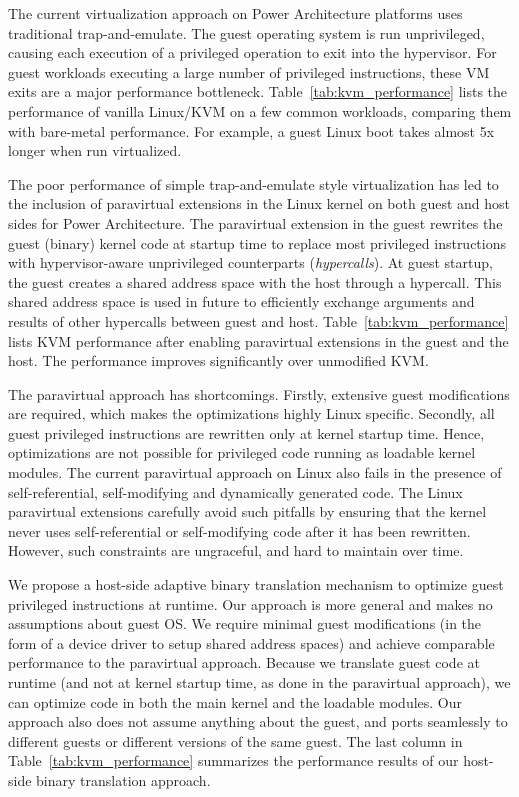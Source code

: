 \documentclass[10pt,twocolumn]{article}
\begin{document}
The current virtualization approach on Power Architecture platforms uses traditional
trap-and-emulate. The guest operating system is run unprivileged, causing each
execution of a privileged
operation to exit into the hypervisor. For guest workloads executing a large number
of privileged instructions, these VM exits are a major performance
bottleneck. Table~\ref{tab:kvm_performance} lists the performance of vanilla Linux/KVM
on a few common workloads, comparing them with bare-metal performance.
For example, a guest Linux boot takes almost 5x longer when run virtualized.

The poor performance of simple trap-and-emulate style virtualization has led to
the inclusion of paravirtual extensions in the Linux kernel on both
guest and host sides for Power Architecture\cite{pvpower}. The paravirtual extension in the guest
rewrites the guest (binary) kernel
code at startup time to replace most privileged instructions with
hypervisor-aware unprivileged counterparts ({\em hypercalls}).
At guest startup, the guest creates a shared address space with
the host through a hypercall. This shared address space
is used in future to efficiently exchange arguments and results of other hypercalls between guest and host.
Table~\ref{tab:kvm_performance} lists KVM performance after enabling paravirtual
extensions in the guest and the host. The performance improves significantly over
unmodified KVM.

The paravirtual approach has shortcomings. Firstly, extensive guest
modifications are required, which makes the optimizations highly Linux specific.
Secondly, all guest
privileged instructions are rewritten only at kernel startup time. Hence,
optimizations are
not possible for privileged code running as loadable kernel modules. The
current paravirtual
approach on Linux also fails in the presence of self-referential, self-modifying
and dynamically generated code. The Linux paravirtual extensions carefully
avoid such pitfalls by ensuring that the kernel never uses self-referential
or self-modifying code after it has been rewritten. However, such constraints are
ungraceful, and hard to maintain over time.

We propose a host-side adaptive binary translation mechanism to optimize guest
privileged instructions at runtime. Our approach is more general and
makes no assumptions about guest OS. We require minimal guest
modifications (in the form of a device driver to setup shared address spaces)
and achieve
comparable performance to the paravirtual approach. Because we translate
guest code at runtime (and not at kernel startup time, as done in the paravirtual
approach), we
can optimize code in both the main kernel and the loadable modules. Our approach also
does not assume anything about the guest, and ports seamlessly to different
guests or different versions of the same guest.
The last column in Table~\ref{tab:kvm_performance} summarizes the performance results of
our host-side binary translation approach.
\end{document}
